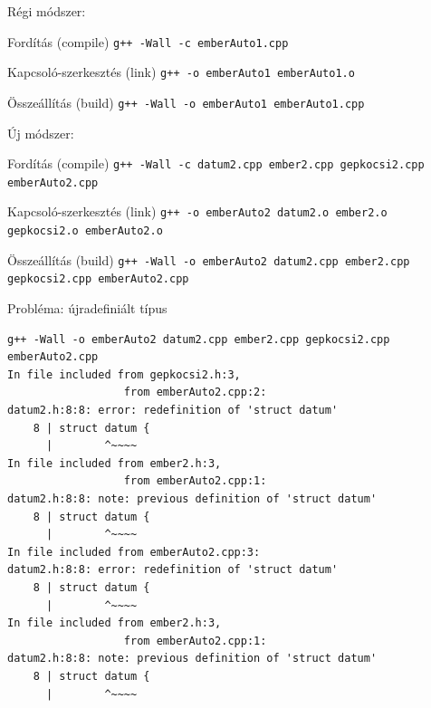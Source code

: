 \documentclass[usenames,dvipsnames,aspectratio=169]{beamer}
\begin{document}
\begin{frame}
  Régi módszer:\\
  \begin{alertblock}{Fordítás (compile)}
    \texttt{g++ -Wall -c emberAuto1.cpp}\\
  \end{alertblock}
  \begin{alertblock}{Kapcsoló-szerkesztés (link)}
    \texttt{g++ -o emberAuto1 emberAuto1.o}\\
  \end{alertblock}
  \vfill
  \begin{alertblock}{Összeállítás (build)}
    \texttt{g++ -Wall -o emberAuto1 emberAuto1.cpp}\\
  \end{alertblock}
\end{frame}

\begin{frame}
  Új módszer:\\
  \begin{exampleblock}{Fordítás (compile)}
    \texttt{g++ -Wall -c datum2.cpp ember2.cpp gepkocsi2.cpp emberAuto2.cpp}\\
  \end{exampleblock}
  \begin{exampleblock}{Kapcsoló-szerkesztés (link)}
    \texttt{g++ -o emberAuto2 datum2.o ember2.o gepkocsi2.o emberAuto2.o}\\
  \end{exampleblock}
  \vfill
  \begin{exampleblock}{Összeállítás (build)}
    \footnotesize
    \texttt{g++ -Wall -o emberAuto2 datum2.cpp ember2.cpp gepkocsi2.cpp emberAuto2.cpp}\\
  \end{exampleblock}
\end{frame}

\begin{frame}[fragile]
  \begin{alertblock}{Probléma: újradefiniált típus}
    \vspace{-.2cm}
    \begin{verbatim}
g++ -Wall -o emberAuto2 datum2.cpp ember2.cpp gepkocsi2.cpp emberAuto2.cpp
In file included from gepkocsi2.h:3,
                  from emberAuto2.cpp:2:
datum2.h:8:8: error: redefinition of 'struct datum'
    8 | struct datum {
      |        ^~~~~
In file included from ember2.h:3,
                  from emberAuto2.cpp:1:
datum2.h:8:8: note: previous definition of 'struct datum'
    8 | struct datum {
      |        ^~~~~
In file included from emberAuto2.cpp:3:
datum2.h:8:8: error: redefinition of 'struct datum'
    8 | struct datum {
      |        ^~~~~
In file included from ember2.h:3,
                  from emberAuto2.cpp:1:
datum2.h:8:8: note: previous definition of 'struct datum'
    8 | struct datum {
      |        ^~~~~
\end{verbatim}
    \vspace{-.2cm}
  \end{alertblock}
\end{frame}
\end{document}
